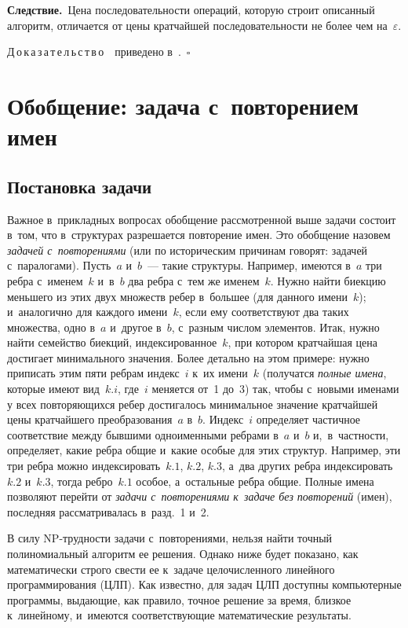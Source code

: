 \begin{multicols}{2}
  \smallskip
  
  \noindent
  \textbf{Следствие.}\ Цена последовательности операций, которую строит 
описанный алгоритм, отличается от цены кратчайшей последовательности не 
более чем на~$\varepsilon$.
  
  \smallskip
  \noindent
  Д\,о\,к\,а\,з\,а\,т\,е\,л\,ь\,с\,т\,в\,о\ \ приведено в~\cite{7-gor}.~$\square$
  
  \section{Обобщение: задача с~повторением имен}
  
  \subsection{Постановка задачи}
  
  Важное в~прикладных вопросах обобщение рассмот\-ренной выше задачи 
состоит в~том, что в~структурах разрешается повторение имен. Это обобщение 
назовем \textit{задачей с~повторениями} (или по историческим причинам 
говорят: задачей с~паралогами). Пусть~$a$ и~$b$~--- такие структуры. 
Например, имеются в~$a$ три реб\-ра с~именем~$k$ и~в~$b$ два реб\-ра с~тем же 
именем~$k$. Нужно найти биекцию меньшего из этих двух множеств ре\-бер 
в~большее (для данного имени~$k$); и~аналогично для каждого имени~$k$, 
если ему соответствуют два таких множества, одно в~$a$ и~другое в~$b$, 
с~разным числом элементов. Итак, нужно найти семейство биекций, 
индексированное~$k$, при котором кратчайшая цена достигает минимального 
значения. Более детально на этом примере: нужно приписать этим пяти реб\-рам 
индекс~$i$ к~их имени~$k$ (получатся \textit{полные имена}, которые имеют 
вид~$k.i$, где~$i$ меняется от~1 до~3) так, чтобы с~новыми именами у всех 
повторяющихся ребер достигалось минимальное значение кратчайшей цены 
кратчайшего преобразования~$a$ в~$b$. Индекс~$i$ определяет частичное 
соответствие между бывшими одноименными реб\-ра\-ми в~$a$ и~$b$ 
и,~в~частности, определяет, какие реб\-ра общие и~какие особые для этих 
структур. Например, эти три реб\-ра можно индексировать~$k.1$, $k.2$, $k.3$, 
а~два других реб\-ра индексировать~$k.2$ и~$k.3$, тогда ребро~$k.1$ особое, 
а~остальные реб\-ра общие. Полные имена позволяют перейти от \textit{задачи 
с~повторениями к~задаче без повторений} (имен), последняя рассматривалась 
в~разд.~1 и~2.
  
  В силу NP-труд\-ности задачи с~повторениями, нельзя найти точный 
полиномиальный алгоритм ее решения. Однако ниже будет показано, как 
математически строго свести ее к~задаче целочисленного линейного 
программирования (ЦЛП). Как известно, для задач ЦЛП доступны 
компьютерные программы, выдающие, как правило, точное решение за время, 
близкое к~линейному, и~имеются соответствующие математические результаты. 
  

\end{multicols}
